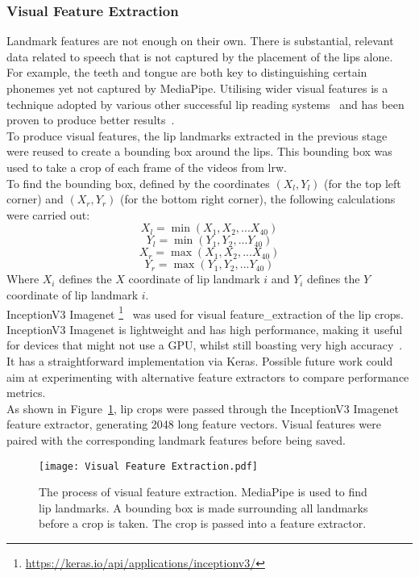 \subsubsection{Visual Feature Extraction}
\label{sec: Visual Feature Extraction}
Landmark features are not enough on their own. There is substantial, relevant data related to speech that is not captured by the placement of the lips alone. For example, the teeth and tongue are both key to distinguishing certain \gls{phoneme}s yet not captured by MediaPipe. Utilising wider visual features is a technique adopted by various other successful lip reading systems~\cite{Lip-reading-techniques} and has been proven to produce better results~\cite{lipreading_with_attention}.\\
To produce visual features, the lip landmarks extracted in the previous stage were reused to create a bounding box around the lips. This bounding box was used to take a crop of each frame of the videos from \gls{lrw}.\\
To find the bounding box, defined by the coordinates $(X_l, Y_l)$ (for the top left corner) and $(X_r, Y_r)$ (for the bottom right corner), the following calculations were carried out:
\[X_l = \min(X_1, X_2,...X_{40})\]
\[Y_l = \min(Y_1, Y_2,...Y_{40})\]
\[X_r = \max(X_1, X_2,...X_{40})\]
\[Y_r = \max(Y_1, Y_2,...Y_{40})\]
Where $X_i$ defines the $X$ coordinate of lip landmark $i$ and $Y_i$ defines the $Y$ coordinate of lip landmark $i$.\\
InceptionV3 Imagenet \footnote{\url{https://keras.io/api/applications/inceptionv3/}}~\cite{InceptionV3} was used for visual \gls{feature_extraction} of the lip crops.\\
InceptionV3 Imagenet is lightweight and has high performance, making it useful for devices that might not use a GPU, whilst still boasting very high accuracy~\cite{InceptionV3}. It has a straightforward implementation via Keras. Possible future work could aim at experimenting with alternative feature extractors to compare performance metrics.\\
As shown in Figure~\ref{fig:Visual Feature Extraction}, lip crops were passed through the InceptionV3 Imagenet feature extractor, generating 2048 long feature vectors. Visual features were paired with the corresponding landmark features before being saved.
\begin{figure}
\centering
\texttt{[image: Visual Feature Extraction.pdf]}
\caption[The process of visual feature extraction.]{The process of visual feature extraction. MediaPipe is used to find lip landmarks. A bounding box is made surrounding all landmarks before a crop is taken. The crop is passed into a feature extractor.}
\label{fig:Visual Feature Extraction}
\end{figure}
